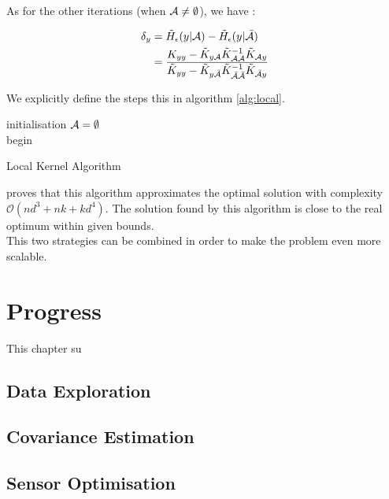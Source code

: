 \documentclass[12pt,twoside]{report}
\begin{document}
As for the other iterations (when $\mathcal{A} \neq \emptyset$), we have : 

\begin{align}
	\delta_y &= \tilde{H}_\epsilon(y | \mathcal{A}) - \tilde{H}_\epsilon(y | \bar{\mathcal{A}}) \\
	&= \frac{K_{yy} - \tilde{K}_{y\mathcal{A}} \tilde{K}_{\mathcal{A}\mathcal{A}}^{-1} \tilde{K}_{\mathcal{A} y} }{\tilde{K}_{yy} - \tilde{K}_{y\bar{\mathcal{A}}} \tilde{K}_{\bar{\mathcal{A}}\bar{\mathcal{A}}}^{-1} \tilde{K}_{\bar{\mathcal{A}} y} } \label{equ:updateLocal}
\end{align}


We explicitly define the steps  this in algorithm \ref{alg:local}. \\

\begin{algorithm}[h]
 initialisation\;
 $\mathcal{A} = \emptyset$ \\
 begin\;
\caption{Local Kernel Algorithm}
\label{alg:local}
\end{algorithm} 


\citet{krause_near-optimal_2008} proves that this algorithm approximates the optimal solution with complexity $\mathcal{O}(nd^3 + nk + kd^4)$. The solution found by this algorithm is close to the real optimum within given bounds. \\

This two strategies can be combined in order to make the problem even more scalable. 


\chapter{Progress}

This chapter su

\section{Data Exploration}

\section{Covariance Estimation}

\section{Sensor Optimisation}


\cite{cressie_statistics_1991}
\cite{arcucci_effective_2018}





\end{document}
